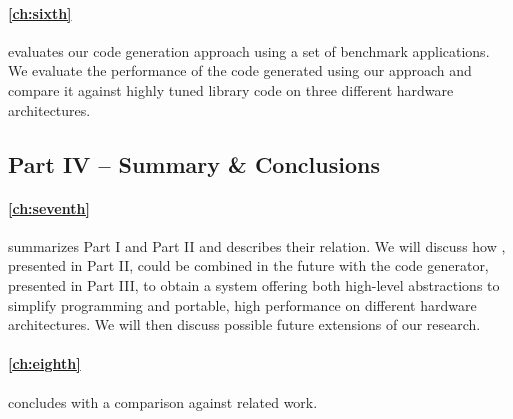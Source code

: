 \paragraph{\autoref{ch:sixth}} evaluates our code generation approach using a set of benchmark applications.
We evaluate the performance of the code generated using our approach and compare it against highly tuned library code on three different hardware architectures.

\subsection*{Part IV -- Summary \& Conclusions}

\paragraph{\autoref{ch:seventh}} summarizes Part I and Part II and describes their relation.
We will discuss how \SkelCL, presented in Part II, could be combined in the future with the code generator, presented in Part III, to obtain a system offering both high-level abstractions to simplify programming and portable, high performance on different hardware architectures.
We will then discuss possible future extensions of our research.

\paragraph{\autoref{ch:eighth}} concludes with a comparison against related work.

